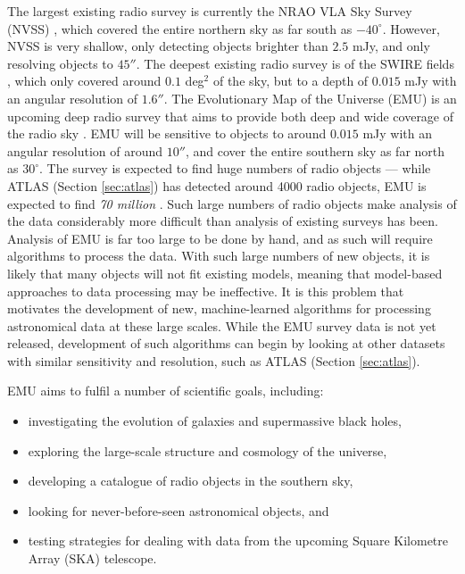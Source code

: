             The largest existing radio survey is currently the NRAO VLA Sky
            Survey (NVSS) \citep{condon98}, which covered the entire northern
            sky as far south as $-40^\circ$. However, NVSS is very shallow, only
            detecting objects brighter than $2.5$ mJy, and only resolving
            objects to $45''$. The deepest existing radio survey is of the SWIRE
            fields \citep{owen08}, which only covered around $0.1$ deg$^2$ of
            the sky, but to a depth of $0.015$ mJy with an angular resolution of
            $1.6''$. The Evolutionary Map of the Universe (EMU) is an upcoming
            deep radio survey that aims to provide both deep and wide coverage
            of the radio sky \citep{norris11}. EMU will be sensitive to objects
            to around $0.015$ mJy with an angular resolution of around $10''$,
            and cover the entire southern sky as far north as $30^\circ$. The
            survey is expected to find huge numbers of radio objects --- while
            ATLAS (Section \ref{sec:atlas}) has detected around 4000 radio
            objects, EMU is expected to find \emph{70 million} \citep{banfield15}. Such large
            numbers of radio objects make analysis of the data considerably more
            difficult than analysis of existing surveys has been. Analysis of
            EMU is far too large to be done by hand, and as such will require
            algorithms to process the data. With such large numbers of new
            objects, it is likely that many objects will not fit existing
            models, meaning that model-based approaches to data processing may
            be ineffective. It is this problem that motivates the development of
            new, machine-learned algorithms for processing astronomical data at
            these large scales. While the EMU survey data is not yet released,
            development of such algorithms can begin by looking at other
            datasets with similar sensitivity and resolution, such as ATLAS
            (Section \ref{sec:atlas}).

            EMU aims to fulfil a number of scientific goals, including:
            \begin{itemize}
                \setlength\itemsep{0 pt}
                \item investigating the evolution of galaxies and supermassive
                    black holes,
                \item exploring the large-scale structure and cosmology of the
                    universe,
                \item developing a catalogue of radio objects in the southern
                    sky,
                \item looking for never-before-seen astronomical objects, and
                \item testing strategies for dealing with data from the upcoming
                    Square Kilometre Array (SKA) telescope.
            \end{itemize}


